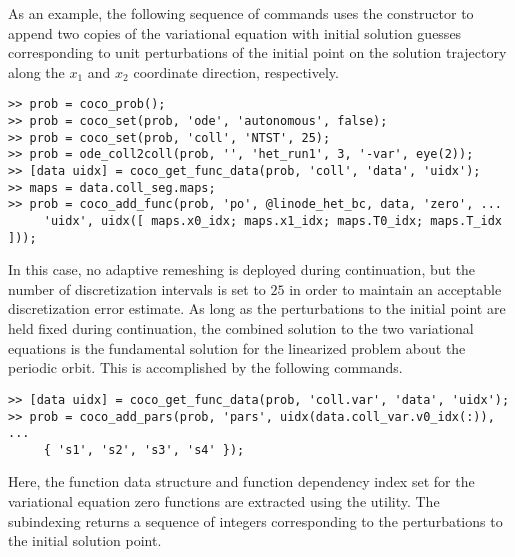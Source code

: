 As an example, the following sequence of commands uses the  constructor to append two copies of the variational equation with initial solution guesses corresponding to unit perturbations of the initial point on the solution trajectory along the $x_1$ and $x_2$ coordinate direction, respectively. 
\begin{lstlisting}[language=coco-highlight]
>> prob = coco_prob();
>> prob = coco_set(prob, 'ode', 'autonomous', false);
>> prob = coco_set(prob, 'coll', 'NTST', 25);
>> prob = ode_coll2coll(prob, '', 'het_run1', 3, '-var', eye(2));
>> [data uidx] = coco_get_func_data(prob, 'coll', 'data', 'uidx');
>> maps = data.coll_seg.maps;
>> prob = coco_add_func(prob, 'po', @linode_het_bc, data, 'zero', ...
     'uidx', uidx([ maps.x0_idx; maps.x1_idx; maps.T0_idx; maps.T_idx ]));
\end{lstlisting}
In this case, no adaptive remeshing is deployed during continuation, but the number of discretization intervals is set to $25$ in order to maintain an acceptable discretization error estimate. As long as the perturbations to the initial point are held fixed during continuation, the combined solution to the two variational equations is the fundamental solution for the linearized problem about the periodic orbit. This is accomplished by the following commands.
\begin{lstlisting}[language=coco-highlight]
>> [data uidx] = coco_get_func_data(prob, 'coll.var', 'data', 'uidx');
>> prob = coco_add_pars(prob, 'pars', uidx(data.coll_var.v0_idx(:)), ...
     { 's1', 's2', 's3', 's4' });
\end{lstlisting}
Here, the function data structure and function dependency index set for the variational equation zero functions are extracted using the  utility. The subindexing  returns a sequence of integers corresponding to the perturbations to the initial solution point.

